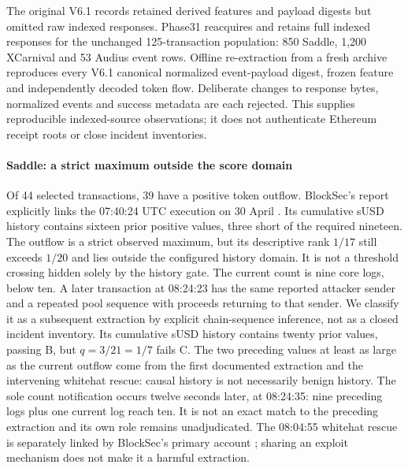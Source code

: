 \documentclass[preprint,12pt,authoryear]{elsarticle}
\begin{document}
The original V6.1 records retained derived features and payload digests but omitted raw indexed responses. Phase31 reacquires and retains full indexed responses for the unchanged 125-transaction population: 850 Saddle, 1,200 XCarnival and 53 Audius event rows. Offline re-extraction from a fresh archive reproduces every V6.1 canonical normalized event-payload digest, frozen feature and independently decoded token flow. Deliberate changes to response bytes, normalized events and success metadata are each rejected. This supplies reproducible indexed-source observations; it does not authenticate Ethereum receipt roots or close incident inventories.

\paragraph{Saddle: a strict maximum outside the score domain}
Of 44 selected transactions, 39 have a positive token outflow. BlockSec's report explicitly links the 07:40:24 UTC execution on 30 April \citep{BlockSec2022Saddle}. Its cumulative sUSD history contains sixteen prior positive values, three short of the required nineteen. The outflow is a strict observed maximum, but its descriptive rank $1/17$ still exceeds $1/20$ and lies outside the configured history domain. It is not a threshold crossing hidden solely by the history gate. The current count is nine core logs, below ten. A later transaction at 08:24:23 has the same reported attacker sender and a repeated pool sequence with proceeds returning to that sender. We classify it as a subsequent extraction by explicit chain-sequence inference, not as a closed incident inventory. Its cumulative sUSD history contains twenty prior values, passing B, but $q=3/21=1/7$ fails C. The two preceding values at least as large as the current outflow come from the first documented extraction and the intervening whitehat rescue: causal history is not necessarily benign history. The sole count notification occurs twelve seconds later, at 08:24:35: nine preceding logs plus one current log reach ten. It is not an exact match to the preceding extraction and its own role remains unadjudicated. The 08:04:55 whitehat rescue is separately linked by BlockSec's primary account \citep{BlockSec2023Rescue}; sharing an exploit mechanism does not make it a harmful extraction.
\end{document}
